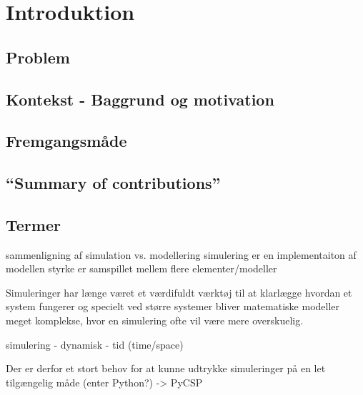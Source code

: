 \chapter{Introduktion}
  \section{Problem}	 
  \section{Kontekst - Baggrund og motivation}
  \section{Fremgangsmåde}
  \section{``Summary of contributions''}
  \section{Termer}


sammenligning af simulation vs. modellering
  simulering er en implementaiton af modellen
  styrke er samspillet mellem flere elementer/modeller


Simuleringer har længe været et værdifuldt værktøj til at klarlægge hvordan et 
system fungerer og specielt ved større systemer bliver matematiske modeller 
meget komplekse, hvor en simulering ofte vil være mere overskuelig.  

simulering - dynamisk - tid (time/space)

Der er derfor et stort behov for at kunne udtrykke simuleringer på en let 
tilgængelig måde (enter Python?) -> PyCSP




  

